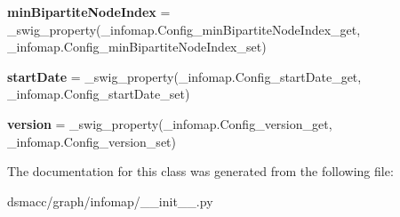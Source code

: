 \begin{DoxyCompactItemize}
{\bfseries min\+Bipartite\+Node\+Index} = \+\_\+swig\+\_\+property(\+\_\+infomap.\+Config\+\_\+min\+Bipartite\+Node\+Index\+\_\+get, \+\_\+infomap.\+Config\+\_\+min\+Bipartite\+Node\+Index\+\_\+set)
\item 
\mbox{\label{classdsmacc_1_1graph_1_1infomap_1_1Config_a6e48186d90b1dcc4a31ed80e1ff5f8a6}} 
{\bfseries start\+Date} = \+\_\+swig\+\_\+property(\+\_\+infomap.\+Config\+\_\+start\+Date\+\_\+get, \+\_\+infomap.\+Config\+\_\+start\+Date\+\_\+set)
\item 
\mbox{\label{classdsmacc_1_1graph_1_1infomap_1_1Config_a9343efd36bb369d7c5cb9d83e7051cf2}} 
{\bfseries version} = \+\_\+swig\+\_\+property(\+\_\+infomap.\+Config\+\_\+version\+\_\+get, \+\_\+infomap.\+Config\+\_\+version\+\_\+set)
\end{DoxyCompactItemize}


The documentation for this class was generated from the following file\+:\begin{DoxyCompactItemize}
\item 
dsmacc/graph/infomap/\+\_\+\+\_\+init\+\_\+\+\_\+.\+py\end{DoxyCompactItemize}
